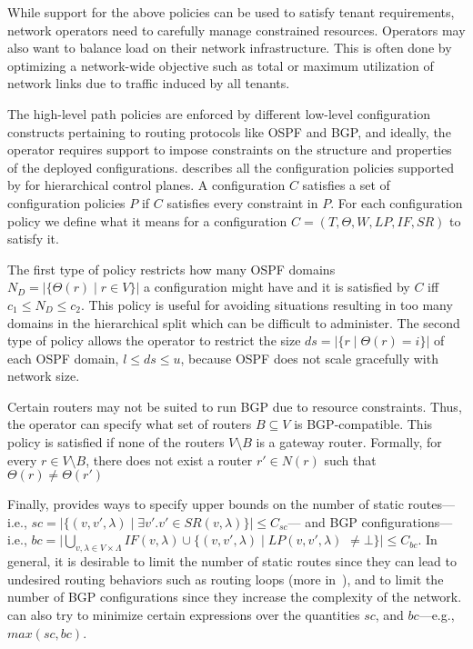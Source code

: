 While support for the above policies can be used to satisfy tenant 
requirements, network operators need to 
carefully manage constrained resources. Operators may also want
to balance load on their network infrastructure. This is often done
by optimizing a network-wide objective such as total or maximum
utilization of network links due to traffic induced by all tenants. 

The high-level path policies are enforced by different low-level 
configuration constructs pertaining to routing protocols like OSPF and BGP, 
and ideally, the operator requires support to impose constraints on the structure 
and properties of the deployed configurations. 
describes all the configuration policies supported by \name for hierarchical 
control planes. 
A configuration $C$ satisfies a set of configuration policies $P$
if $C$ satisfies every constraint in $P$.
For each configuration policy 
we define what it means for  a configuration $C=(T,\Theta,W,LP,IF,SR)$ to satisfy it.

The first type of policy restricts how many OSPF domains $N_D= |\{\Theta(r)\mid r\in V\}|$ a
configuration might have
and it is satisfied by $C$ iff $c_1\leq N_D \leq
c_2$.  This policy is useful for avoiding situations resulting in too
many domains in the hierarchical split which can be difficult to
administer.  The second type of policy allows the operator to restrict
the size $ds=|\{r \mid \Theta(r)=i\}|$ of each OSPF domain, $l\leq ds\leq u$, because OSPF does
not scale gracefully with network size.  


 Certain 
	routers may not be suited to run BGP due to resource
	constraints. Thus, the operator can specify what set of 
	routers $B\subseteq V$ is BGP-compatible.  
	This policy is satisfied if none of the routers $V\setminus B$
	is a gateway router.
	Formally, for every $r\in V\setminus B$,
	there does not exist a router $r'\in N(r)$ such that $\Theta(r) \not= \Theta(r')$


Finally, \name provides ways to specify upper bounds on the number of
static routes---i.e., $sc=|\{(v, v', \lambda)\mid \exists v'. v' \in SR(v,\lambda)\}|\leq C_{sc}$--- and
BGP configurations---i.e., 
$bc=|\bigcup_{v,\lambda\in V\times\Lambda} IF(v,\lambda)\cup \{(v,v',\lambda)\mid LP(v,v',\lambda)$ $\neq \bot\}|\leq C_{bc}$.
In general, it is desirable to limit the number of static routes since they
can lead to undesired routing behaviors such as routing loops (more in~), and to limit the number of BGP configurations
since they increase the complexity of the network.
\name can  also try to minimize certain expressions over the quantities $sc$, and $bc$---e.g., $max(sc, bc)$. 

